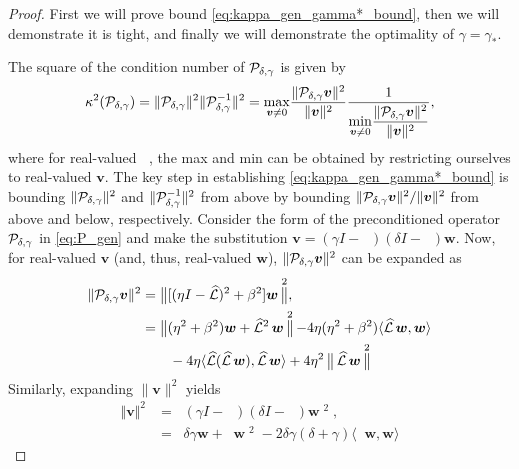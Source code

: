 \documentclass[review]{siamart}
\DeclareMathOperator{\cL}{\widehat{\mathcal{L}}}
\DeclareMathOperator{\cLs}{\widehat{\mathcal{L}}^2}
\DeclareMathOperator{\bVert}{\big\Vert}
\begin{document}
\begin{proof}
First we will prove bound \eqref{eq:kappa_gen_gamma*_bound}, then we will demonstrate it is tight, and finally we will demonstrate the optimality of $\gamma=\gamma_*$.

The square of the condition number of ${\cal P}_{\delta, \gamma}$ is given by
%
\begin{align}
\label{eq:kappa_gen_def}
\kappa^2({\cal P}_{\delta,\gamma}) 
= 
\Vert {\cal P}_{\delta,\gamma} \Vert^2 
\Vert {\cal P}_{\delta,\gamma}^{-1} \Vert^2
=
\underset{{\bm{v} \neq 0}}{\max} \frac{\Vert {\cal P}_{\delta,\gamma} \bm{v} \Vert^2 }{\Vert \bm{v} \Vert^2} 
\frac{1}{\displaystyle{\underset{{\bm{v} \neq 0}}{\min} \frac{\Vert {\cal P}_{\delta,\gamma} \bm{v} \Vert^2 }{\Vert \bm{v} \Vert^2}}},
\end{align}
%
where for real-valued $\cL$, the max and min can be obtained by restricting ourselves
to real-valued $\bm{v}$. The key step in establishing \eqref{eq:kappa_gen_gamma*_bound} is bounding
$\Vert {\cal P}_{\delta,\gamma} \Vert^2$ and $\Vert {\cal P}_{\delta,\gamma}^{-1} \Vert^2$ from above
by bounding $\Vert {\cal P}_{\delta,\gamma} \bm{v} \Vert^2 / \Vert \bm{v} \Vert^2$
from above and below, respectively.
%
Consider the form of the preconditioned operator ${\cal P}_{\delta,\gamma}$ in
\eqref{eq:P_gen} and make the substitution $\bm{v} = (\gamma I - \cL) (\delta I - \cL) \bm{w}$. 
Now, for real-valued $\bm{v}$ (and, thus, real-valued $\bm{w}$),
$\|{\cal P}_{\delta,\gamma} \bm{v}\|^2$ can be expanded as
%
\begin{align}
\label{eq:norm_Pv_gen}
\begin{split}
\Vert {\cal P}_{\delta, \gamma} \bm{v} \Vert^2
&=
\bVert [( \eta I - \cL)^2 + \beta^2] \bm{w} \bVert^2, \\
&=
\bVert (\eta^2 + \beta^2) \bm{w} + \cLs \bm{w} \bVert^2  
	-4 \eta (\eta^2 +\beta^2) \langle \cL \bm{w}, \bm{w} \rangle 
	\\&\quad\quad	
	-4 \eta \langle \cL (\cL \bm{w}), \cL \bm{w} \rangle
	+4 \eta^2 \bVert \cL \bm{w} \bVert^2
\end{split}
\end{align}
%
Similarly, expanding $\|\bm{v}\|^2$ yields
%
\begin{align}
\label{eq:norm_v_gen}
\Vert \bm{v} \Vert^2
&=
\bVert ( \gamma I - \cL) ( \delta I - \cL) \bm{w} \bVert^2, \\
&=
\nonumber
\bVert \delta \gamma \bm{w} + \cLs \bm{w} \bVert^2  
	- 2 \delta \gamma (\delta + \gamma ) \langle \cL \bm{w}, \bm{w} \rangle

\end{align}
\end{proof}
\end{document}
